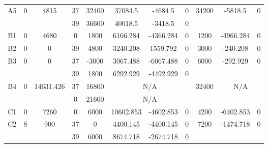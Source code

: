 \begin{sidewaystable}
\begin{tabular}{c||c|c||c|c|c|c|c||c|c|c}
        
      \\
      \hline
      \multirow{2}{*}{A5} &
      \multirow{2}{*}{0} &
      \multirow{2}{*}{4815} &
      37 &
      32400 &
        37084.5 &
        -4684.5 &
        0 &
      \multirow{2}{*}{34200} &
        \multirow{2}{*}{-5818.5} &
        \multirow{2}{*}{0}
      \\
      \cline{4-8}
       &
       &
       &
      39 &
      36600 &
        40018.5 &
        -3418.5 &
        0 &
      
         &
        
      \\
      \hline
      \multirow{1}{*}{B1} &
      \multirow{1}{*}{0} &
      \multirow{1}{*}{4680} &
      0 &
      1800 &
        6166.284 &
        -4366.284 &
        0 &
      \multirow{1}{*}{1200} &
        \multirow{1}{*}{-4966.284} &
        \multirow{1}{*}{0}
      \\
      \hline
      \multirow{1}{*}{B2} &
      \multirow{1}{*}{0} &
      \multirow{1}{*}{0} &
      39 &
      4800 &
        3240.208 &
        1559.792 &
        0 &
      \multirow{1}{*}{3000} &
        \multirow{1}{*}{-240.208} &
        \multirow{1}{*}{0}
      \\
      \hline
      \multirow{2}{*}{B3} &
      \multirow{2}{*}{0} &
      \multirow{2}{*}{0} &
      37 &
      -3000 &
        3067.488 &
        -6067.488 &
        0 &
      \multirow{2}{*}{6000} &
        \multirow{2}{*}{-292.929} &
        \multirow{2}{*}{0}
      \\
      \cline{4-8}
       &
       &
       &
      39 &
      1800 &
        6292.929 &
        -4492.929 &
        0 &
      
         &
        
      \\
      \hline
      \multirow{2}{*}{B4} &
      \multirow{2}{*}{0} &
      \multirow{2}{*}{14631.426} &
      37 &
      16800 &
        \multicolumn{3}{|c||}{N/A} &
      \multirow{2}{*}{32400} &
        \multicolumn{2}{c}{\multirow{2}{*}{N/A}}
      \\
      \cline{4-8}
       &
       &
       &
      0 &
      21600 &
        \multicolumn{3}{|c||}{N/A} &
      
        
      \\
      \hline
      \multirow{1}{*}{C1} &
      \multirow{1}{*}{0} &
      \multirow{1}{*}{7260} &
      0 &
      6000 &
        10602.853 &
        -4602.853 &
        0 &
      \multirow{1}{*}{4200} &
        \multirow{1}{*}{-6402.853} &
        \multirow{1}{*}{0}
      \\
      \hline
      \multirow{2}{*}{C2} &
      \multirow{2}{*}{8} &
      \multirow{2}{*}{900} &
      37 &
      0 &
        4400.145 &
        -4400.145 &
        0 &
      \multirow{2}{*}{7200} &
        \multirow{2}{*}{-1474.718} &
        \multirow{2}{*}{0}
      \\
      \cline{4-8}
       &
       &
       &
      39 &
      6000 &
        8674.718 &
        -2674.718 &
        0 &
      

\end{tabular}
\end{sidewaystable}
